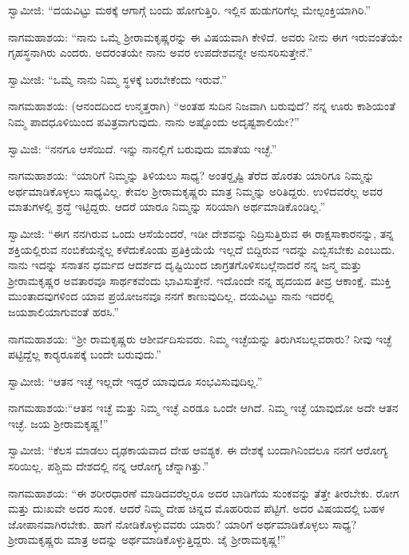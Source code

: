  ಸ್ವಾಮೀಜಿ: “ದಯವಿಟ್ಟು ಮಠಕ್ಕೆ ಆಗಾಗ್ಗೆ ಬಂದು ಹೋಗುತ್ತಿರಿ. ಇಲ್ಲಿನ ಹುಡುಗರಿಗೆಲ್ಲ ಮೇಲ್ಪಂಕ್ತಿಯಾಗಿರಿ.” 

 ನಾಗಮಹಾಶಯ: “ನಾನು ಒಮ್ಮೆ ಶ‍್ರೀರಾಮಕೃಷ್ಣರನ್ನು ಈ ವಿಷಯವಾಗಿ ಕೇಳಿದೆ. ಅವರು ನೀನು ಈಗ ಇರುವಂತೆಯೇ ಗೃಹಸ್ಥನಾಗಿರು ಎಂದರು. ಅದರಂತಯೇ ನಾನು ಅವರ ಉಪದೇಶವನ್ನೇ ಅನುಸರಿಸುತ್ತೇನೆ.” 

 ಸ್ವಾಮೀಜಿ: “ಒಮ್ಮೆ ನಾನು ನಿಮ್ಮ ಸ್ಥಳಕ್ಕೆ ಬರಬೇಕೆಂದು ಇರುವೆ.” 

\vskip 1pt

 ನಾಗಮಹಾಶಯ: (ಆನಂದದಿಂದ ಉನ್ಮತ್ತರಾಗಿ) “ಅಂತಹ ಸುದಿನ ನಿಜವಾಗಿ ಬರುವುದೆ? ನನ್ನ ಊರು ಕಾಶಿಯಂತೆ ನಿಮ್ಮ ಪಾದಧೂಳಿಯಿಂದ ಪವಿತ್ರವಾಗುವುದು. ನಾನು ಅಷ್ಟೊಂದು ಅದೃಷ್ಟಶಾಲಿಯೇ?” 

\vskip 1pt

 ಸ್ವಾಮಿಜಿ: “ನನಗೂ ಆಸೆಯಿದೆ. ಇನ್ನು ನಾನಲ್ಲಿಗೆ ಬರುವುದು ಮಾತೆಯ ಇಚ್ಛೆ.” 

\vskip 1pt

 ನಾಗಮಹಾಶಯ: “ಯಾರಿಗೆ ನಿಮ್ಮನ್ನು ತಿಳಿಯಲು ಸಾಧ್ಯ? ಅಂತರ್‍ದೃಷ್ಟಿ ತೆರೆದ ಹೊರತು ಯಾರಿಗೂ ನಿಮ್ಮನ್ನು ಅರ್ಥಮಾಡಿಕೊಳ್ಳಲು ಸಾಧ್ಯವಿಲ್ಲ. ಕೇವಲ ಶ‍್ರೀರಾಮಕೃಷ್ಣರು ಮಾತ್ರ ನಿಮ್ಮನ್ನು ಅರಿತಿದ್ದರು. ಉಳಿದವರೆಲ್ಲ ಅವರ ಮಾತುಗಳಲ್ಲಿ ಶ್ರದ್ಧೆ ಇಟ್ಟಿದ್ದರು. ಆದರೆ ಯಾರೂ ನಿಮ್ಮನ್ನು ಸರಿಯಾಗಿ ಅರ್ಥಮಾಡಿಕೊಂಡಿಲ್ಲ.” 

\vskip 1pt

 ಸ್ವಾಮೀಜಿ: “ಈಗ ನನಗಿರುವ ಒಂದು ಆಸೆಯೆಂದರೆ, ಇಡೀ ದೇಶವನ್ನು ನಿದ್ರಿಸುತ್ತಿರುವ ಈ ರಾಕ್ಷಸಾಕಾರನನ್ನು, ತನ್ನ ಶಕ್ತಿಯಲ್ಲಿರುವ ನಂಬಿಕೆಯನ್ನೆಲ್ಲ ಕಳೆದುಕೊಂಡು ಪ್ರತಿಕ್ರಿಯೆಯೆ ಇಲ್ಲದೆ ಬಿದ್ದಿರುವ ಇದನ್ನು ಎಬ್ಬಿಸಬೇಕು ಎಂಬುದು. ನಾನು ಇದನ್ನು ಸನಾತನ ಧರ್ಮದ ಆದರ್ಶದ ದೃಷ್ಟಿಯಿಂದ ಜಾಗ್ರತಗೊಳಿಸಬಲ್ಲೆನಾದರೆ ನನ್ನ ಜನ್ಮ ಮತ್ತು ಶ‍್ರೀರಾಮಕೃಷ್ಣರ ಅವತಾರವೂ ಸಾರ್ಥಕವೆಂದು ಭಾವಿಸುತ್ತೇನೆ. ಇದೊಂದೇ ನನ್ನ ಹೃದಯದ ತೀವ್ರ ಆಕಾಂಕ್ಷೆ. ಮುಕ್ತಿ ಮುಂತಾದವುಗಳಿಂದ ಯಾವ ಪ್ರಯೋಜನವೂ ನನಗೆ ಕಾಣುವುದಿಲ್ಲ. ದಯವಿಟ್ಟು ನಾನು ಇದರಲ್ಲಿ ಜಯಶಾಲಿಯಾಗುವಂತೆ ಹರಸಿ.” 

\vskip 1pt

 ನಾಗಮಹಾಶಯ: “ಶ‍್ರೀ ರಾಮಕೃಷ್ಣರು ಆಶೀರ್ವದಿಸುವರು. ನಿಮ್ಮ ಇಚ್ಛೆಯನ್ನು ತಿರುಗಿಸಬಲ್ಲವರಾರು? ನೀವು ಇಚ್ಛೆ ಪಟ್ಟಿದ್ದೆಲ್ಲ ಕಾರ‍್ಯರೂಪಕ್ಕೆ ಬಂದೇ‌ ಬರುವುದು.” 

\vskip 1pt

 ಸ್ವಾಮೀಜಿ: “ಆತನ ಇಚ್ಛೆ ಇಲ್ಲದೇ ಇದ್ದರೆ ಯಾವುದೂ ಸಂಭವಿಸುವುದಿಲ್ಲ.” 

\vskip 1pt

 ನಾಗಮಹಾಶಯ:‌“ಆತನ ಇಚ್ಛೆ ಮತ್ತು ನಿಮ್ಮ ಇಚ್ಛೆ ಎರಡೂ ಒಂದೇ ಆಗಿದೆ. ನಿಮ್ಮ ಇಚ್ಛೆ ಯಾವುದೋ ಅದೇ ಆತನ ಇಚ್ಛೆ. ಜಯ ಶ‍್ರೀರಾಮಕೃಷ್ಣ!” 

 ಸ್ವಾಮೀಜಿ: “ಕೆಲಸ ಮಾಡಲು ದೃಢಕಾಯವಾದ ದೇಹ ಆವಶ್ಯಕ. ಈ ದೇಶಕ್ಕೆ ಬಂದಾಗಿನಿಂದಲೂ ನನಗೆ ಆರೋಗ್ಯ ಸರಿಯಿಲ್ಲ. ಪಶ್ಚಿಮ ದೇಶದಲ್ಲಿ ನನ್ನ ಆರೋಗ್ಯ ಚೆನ್ನಾಗಿತ್ತು.” 

 ನಾಗಮಹಾಶಯ: “ಈ ಶರೀರಧಾರಣೆ ಮಾಡಿದವರೆಲ್ಲರೂ ಅದರ ಬಾಡಿಗೆಯ ಸುಂಕವನ್ನು ತೆತ್ತೇ ತೀರಬೇಕು. ರೋಗ ಮತ್ತು ದುಃಖವೇ ಅದರ ಸುಂಕ. ಆದರೆ ನಿಮ್ಮ ದೇಹ ಚಿನ್ನದ ಮೊಹರಿರುವ ಪೆಟ್ಟಿಗೆ. ಅದರ ವಿಷಯದಲ್ಲಿ ಬಹಳ ಜೋಪಾನವಾಗಿರಬೇಕು. ಹಾಗೆ ನೋಡಿಕೊಳ್ಳುವವರು ಯಾರು? ಯಾರಿಗೆ ಅರ್ಥಮಾಡಿಕೊಳ್ಳಲು ಸಾಧ್ಯ? ಶ‍್ರೀರಾಮಕೃಷ್ಣರು ಮಾತ್ರ ಅದನ್ನು ಅರ್ಥಮಾಡಿಕೊಳ್ಳುತ್ತಿದ್ದರು. ಜೈ ಶ‍್ರೀರಾಮಕೃಷ್ಣ!” 

